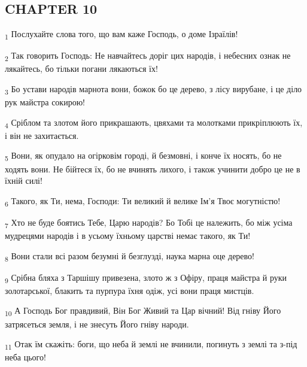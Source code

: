\subsection{CHAPTER 10}
\begin{tcolorbox}
\textsubscript{1} Послухайте слова того, що вам каже Господь, о доме Ізраїлів!
\end{tcolorbox}
\begin{tcolorbox}
\textsubscript{2} Так говорить Господь: Не навчайтесь доріг цих народів, і небесних ознак не лякайтесь, бо тільки погани лякаються їх!
\end{tcolorbox}
\begin{tcolorbox}
\textsubscript{3} Бо устави народів марнота вони, божок бо це дерево, з лісу вирубане, і це діло рук майстра сокирою!
\end{tcolorbox}
\begin{tcolorbox}
\textsubscript{4} Сріблом та злотом його прикрашають, цвяхами та молотками прикріплюють їх, і він не захитається.
\end{tcolorbox}
\begin{tcolorbox}
\textsubscript{5} Вони, як опудало на огірковім городі, й безмовні, і конче їх носять, бо не ходять вони. Не бійтеся їх, бо не вчинять лихого, і також учинити добро це не в їхній силі!
\end{tcolorbox}
\begin{tcolorbox}
\textsubscript{6} Такого, як Ти, нема, Господи: Ти великий й велике Ім'я Твоє могутністю!
\end{tcolorbox}
\begin{tcolorbox}
\textsubscript{7} Хто не буде боятись Тебе, Царю народів? Бо Тобі це належить, бо між усіма мудрецями народів і в усьому їхньому царстві немає такого, як Ти!
\end{tcolorbox}
\begin{tcolorbox}
\textsubscript{8} Вони стали всі разом безумні й безглузді, наука марна оце дерево!
\end{tcolorbox}
\begin{tcolorbox}
\textsubscript{9} Срібна бляха з Таршішу привезена, злото ж з Офіру, праця майстра й руки золотарської, блакить та пурпура їхня одіж, усі вони праця мистців.
\end{tcolorbox}
\begin{tcolorbox}
\textsubscript{10} А Господь Бог правдивий, Він Бог Живий та Цар вічний! Від гніву Його затрясеться земля, і не знесуть Його гніву народи.
\end{tcolorbox}
\begin{tcolorbox}
\textsubscript{11} Отак їм скажіть: боги, що неба й землі не вчинили, погинуть з землі та з-під неба цього!
\end{tcolorbox}
